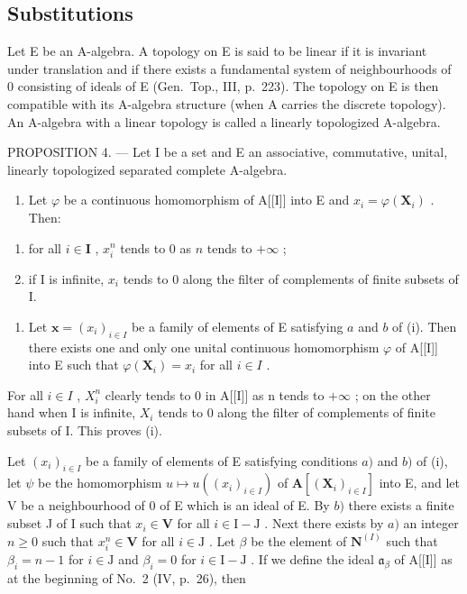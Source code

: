 \subsection{Substitutions}

Let E be an A-algebra. A topology on E is said to be linear if it is invariant under translation and if there exists a fundamental system of neighbourhoods of 0 consisting of ideals of E (Gen.~Top., III, p.~223). The topology on E is then compatible with its A-algebra structure (when A carries the discrete topology). An A-algebra with a linear topology is called a linearly topologized A-algebra.

PROPOSITION 4. --- Let I be a set and E an associative, commutative, unital, linearly topologized separated complete A-algebra.

\begin{enumerate}
\def\labelenumi{(\roman{enumi})}
\tightlist
\item
  Let \(\varphi\) be a continuous homomorphism of A{[}{[}I{]}{]} into E and \(x_{i} = \varphi (\mathbf{X}_{i})\) . Then:
\end{enumerate}

\begin{enumerate}
\def\labelenumi{(\alph{enumi})}
\item
  for all \(i \in \mathbf{I}\) , \(x_{i}^{n}\) tends to 0 as \(n\) tends to \(+\infty\) ;
\item
  if I is infinite, \(x_{i}\) tends to 0 along the filter of complements of finite subsets of I.
\end{enumerate}

\begin{enumerate}
\def\labelenumi{(\roman{enumi})}
\setcounter{enumi}{1}
\tightlist
\item
  Let \(\mathbf{x} = (x_i)_{i\in I}\) be a family of elements of E satisfying \(a\) and \(b\) of (i). Then there exists one and only one unital continuous homomorphism \(\varphi\) of A{[}{[}I{]}{]} into E such that \(\varphi (\mathbf{X}_i) = x_i\) for all \(i\in I\) .
\end{enumerate}

For all \(i \in I\) , \(X_{i}^{n}\) clearly tends to 0 in A{[}{[}I{]}{]} as n tends to \(+\infty\) ; on the other hand when I is infinite, \(X_{i}\) tends to 0 along the filter of complements of finite subsets of I. This proves (i).

Let \((x_{i})_{i\in I}\) be a family of elements of E satisfying conditions \(a)\) and \(b)\) of (i), let \(\psi\) be the homomorphism \(u\mapsto u((x_i)_{i\in I})\) of \(\mathbf{A}[(\mathbf{X}_i)_{i\in I}]\) into E, and let V be a neighbourhood of 0 of E which is an ideal of E. By \(b)\) there exists a finite subset J of I such that \(x_{i}\in \mathbf{V}\) for all \(i\in \mathrm{I - J}\) . Next there exists by \(a)\) an integer \(n\geqslant 0\) such that \(x_{i}^{n}\in \mathbf{V}\) for all \(i\in \mathrm{J}\) . Let \(\beta\) be the element of \(\mathbf{N}^{(I)}\) such that \(\beta_{i} = n - 1\) for \(i\in \mathrm{J}\) and \(\beta_{i} = 0\) for \(i\in \mathrm{I - J}\) . If we define the ideal \(\mathfrak{a}_{\beta}\) of A{[}{[}I{]}{]} as at the beginning of No.~2 (IV, p.~26), then

